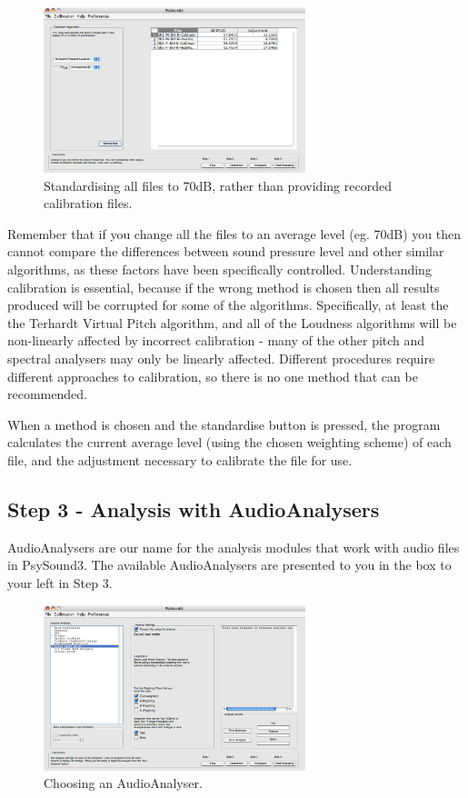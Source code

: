 \documentclass{article}
\begin{document}
\begin{figure}[htbp]
	\centering
		\includegraphics[width=3in]{Step2-StandardiseTo70.jpg}
	\caption{Standardising all files to 70dB, rather than providing recorded calibration files.}
	\label{fig:stage04b}
\end{figure}

Remember that if you change all the files to an average level (eg. 70dB) you then cannot compare the differences between sound pressure level and other similar algorithms, as these factors have been specifically controlled. Understanding calibration is essential, because if the wrong method is chosen then all results produced will be corrupted for some of the algorithms. Specifically, at least the the Terhardt Virtual Pitch algorithm, and all of the Loudness algorithms will be non-linearly affected by incorrect calibration - many of the other pitch and spectral analysers may only be linearly affected. Different procedures require different approaches to calibration, so there is no one method that can be recommended.

When a method is chosen and the standardise button is pressed, the program calculates the current average level (using the chosen weighting scheme) of each file, and the adjustment necessary to calibrate the file for use.

\subsection{Step 3 - Analysis with AudioAnalysers} 

AudioAnalysers are our name for the analysis modules that work with audio files in PsySound3. The available AudioAnalysers are presented to you in the box to your left in Step 3. 

\begin{figure}[htbp]
	\centering
		\includegraphics[width=3in]{Step3-ChooseAnalyser.jpg}
	\caption{Choosing an AudioAnalyser.}
	\label{fig:stage08}
\end{figure}
\end{document}
